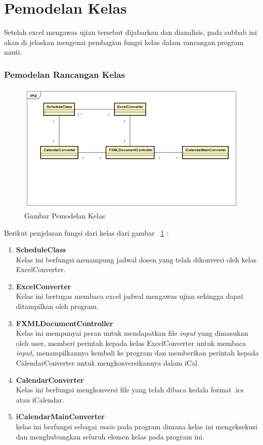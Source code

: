 \section{Pemodelan Kelas}
Setelah excel mengawas ujian tersebut dijabarkan dan dianalisis, pada subbab ini akan di jelaskan mengenai pembagian fungsi
kelas dalam rancangan program nanti.

\subsubsection{Pemodelan Rancangan Kelas}
\begin{figure}[H]
	\centering
	\includegraphics[scale=0.5]{Gambar/pemodelan-kelas}
	\caption{Gambar Pemodelan Kelas}
	\label{fig:pemodelan-kelas}
\end{figure}

Berikut penjelasan fungsi dari kelas dari gambar ~\ref{fig:pemodelan-kelas} :	
\begin{enumerate}
	\item \textbf{ScheduleClass}\\
	Kelas ini berfungsi menampung jadwal dosen yang telah dikonversi oleh kelas ExcelConverter.
	\item \textbf{ExcelConverter}\\
	Kelas ini bertugas membaca excel jadwal mengawas ujian sehingga dapat ditampilkan oleh program.
	\item \textbf{FXMLDocumentController}\\
	Kelas ini mempunyai peran untuk mendapatkan file \textit{input} yang dimasukan oleh user,  memberi perintah 
	kepada kelas ExcelConverter untuk membaca \textit{input}, menampilkannya kembali ke program dan memberikan perintah
	kepada CalendarConverter untuk mengkonversikannya dalam iCal.
	\item \textbf{CalendarConverter}\\
	Kelas ini berfungsi mengkonversi file yang telah dibaca kedala format .ics atau iCalendar.
	\item \textbf{iCalendarMainConverter}\\
	kelas ini berfungsi sebagai \textit{main} pada program dimana kelas ini mengeksekusi dan menghubungkan seluruh elemen kelas 
	pada program ini.
\end{enumerate}
